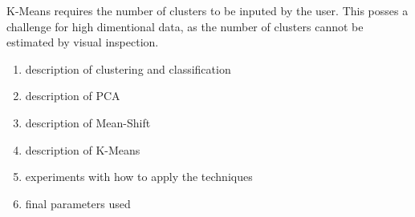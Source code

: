 K-Means requires the number of clusters to be inputed by the user. 
This posses a challenge for high dimentional data, as the number of clusters cannot be estimated by visual inspection. 





\begin{enumerate}
\item description of clustering and classification 
\item description of PCA
\item description of Mean-Shift
\item description of K-Means
\item experiments with how to apply the techniques
\item final parameters used
\end{enumerate}

